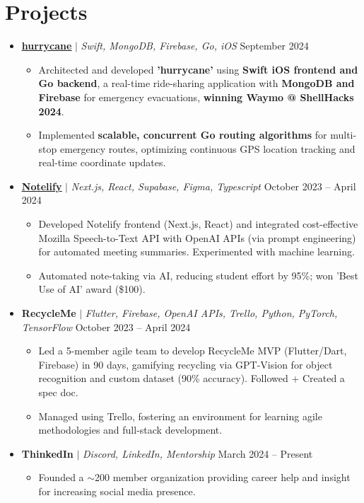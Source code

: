 \documentclass[letterpaper,11pt]{article}
\newcommand{\resumeItem}[1]{
  \item\small{
    {#1 \vspace{-2pt}}
  }
}
\newcommand{\resumeProjectHeading}[2]{
  \item
  \small#1 \hfill #2 \\
  \vspace{-7pt} %
}
\newcommand{\resumeSubHeadingListStart}{\begin{itemize}[leftmargin=0.15in, label={}]}
\newcommand{\resumeSubHeadingListEnd}{\end{itemize}}
\newcommand{\resumeItemListStart}{\begin{itemize}}
\newcommand{\resumeItemListEnd}{\end{itemize}\vspace{-5pt}}
\begin{document}
\section{Projects}
    \resumeSubHeadingListStart
    \resumeProjectHeading
          {\underline{\textbf {\href{https://github.com/keshavbabu/shellhacks/tree/main}{hurrycane}}} $|$ \emph{Swift, MongoDB, Firebase, Go, iOS}}{September 2024}
          \resumeItemListStart
            \resumeItem{Architected and developed \textbf{'hurrycane'} using \textbf{Swift iOS frontend and Go backend}, a real-time ride-sharing application with \textbf{MongoDB and Firebase} for emergency evacuations, \textbf{winning Waymo @ ShellHacks 2024}.}
            \resumeItem{Implemented \textbf{scalable, concurrent Go routing algorithms} for multi-stop emergency routes, optimizing continuous GPS location tracking and real-time coordinate updates.}
          \resumeItemListEnd
      \resumeProjectHeading
          {\underline{\textbf {\href{https://www.notelify.co/}{Notelify}}} $|$ \emph{Next.js, React, Supabase, Figma, Typescript}}{October 2023 -- April 2024}
          \resumeItemListStart
            \resumeItem{Developed Notelify frontend (Next.js, React) and integrated cost-effective Mozilla Speech-to-Text API with OpenAI APIs (via prompt engineering) for automated meeting summaries. Experimented with machine learning.}
            \resumeItem{Automated note-taking via AI, reducing student effort by 95\%; won 'Best Use of AI' award (\$100).}
          \resumeItemListEnd
      \resumeProjectHeading
          {\textbf{RecycleMe} $|$ \emph{Flutter, Firebase, OpenAI APIs, Trello, Python, PyTorch, TensorFlow}}{October 2023 -- April 2024}
          \resumeItemListStart
            \resumeItem{Led a 5-member agile team to develop RecycleMe MVP (Flutter/Dart, Firebase) in 90 days, gamifying recycling via GPT-Vision for object recognition and custom dataset (90\% accuracy). Followed + Created a spec doc.}
            \resumeItem{Managed using Trello, fostering an environment for learning agile methodologies and full-stack development.}
          \resumeItemListEnd
    \resumeProjectHeading
          {\textbf{ThinkedIn} $|$ \emph{Discord, LinkedIn, Mentorship}}{March 2024 -- Present}
          \resumeItemListStart
            \resumeItem{Founded a \(\sim \)200 member organization providing career help and insight for increasing social media presence.}
          \resumeItemListEnd
    \resumeSubHeadingListEnd

\end{document}
